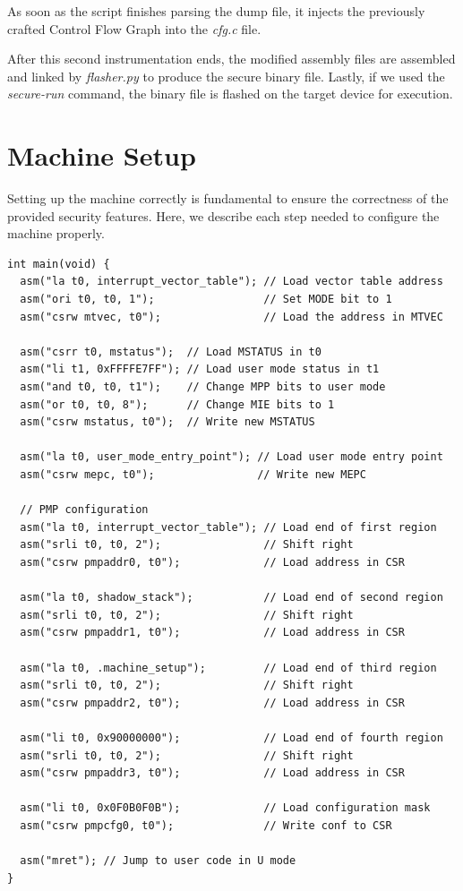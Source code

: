 As soon as the script finishes parsing the dump file, it injects the previously crafted
Control Flow Graph into the \textit{cfg.c} file.

After this second instrumentation ends, the modified assembly files are assembled
and linked by \textit{flasher.py} to produce the secure binary file. Lastly, if
we used the \textit{secure-run} command, the binary file is flashed on the
target device for execution.

\section{Machine Setup}
\label{sec:project_setup}

Setting up the machine correctly is fundamental to ensure the correctness of the
provided security features. Here, we describe each step needed to configure the machine
properly. \\
\begin{lstlisting}[style=CStyle, caption = Machine setup, label={lst:setup}]
int main(void) {
  asm("la t0, interrupt_vector_table"); // Load vector table address
  asm("ori t0, t0, 1");                 // Set MODE bit to 1
  asm("csrw mtvec, t0");                // Load the address in MTVEC

  asm("csrr t0, mstatus");  // Load MSTATUS in t0
  asm("li t1, 0xFFFFE7FF"); // Load user mode status in t1
  asm("and t0, t0, t1");    // Change MPP bits to user mode
  asm("or t0, t0, 8");      // Change MIE bits to 1
  asm("csrw mstatus, t0");  // Write new MSTATUS

  asm("la t0, user_mode_entry_point"); // Load user mode entry point
  asm("csrw mepc, t0");                // Write new MEPC

  // PMP configuration
  asm("la t0, interrupt_vector_table"); // Load end of first region
  asm("srli t0, t0, 2");                // Shift right
  asm("csrw pmpaddr0, t0");             // Load address in CSR

  asm("la t0, shadow_stack");           // Load end of second region
  asm("srli t0, t0, 2");                // Shift right
  asm("csrw pmpaddr1, t0");             // Load address in CSR

  asm("la t0, .machine_setup");         // Load end of third region
  asm("srli t0, t0, 2");                // Shift right
  asm("csrw pmpaddr2, t0");             // Load address in CSR

  asm("li t0, 0x90000000");             // Load end of fourth region
  asm("srli t0, t0, 2");                // Shift right
  asm("csrw pmpaddr3, t0");             // Load address in CSR

  asm("li t0, 0x0F0B0F0B");             // Load configuration mask
  asm("csrw pmpcfg0, t0");              // Write conf to CSR

  asm("mret"); // Jump to user code in U mode
}
\end{lstlisting}

